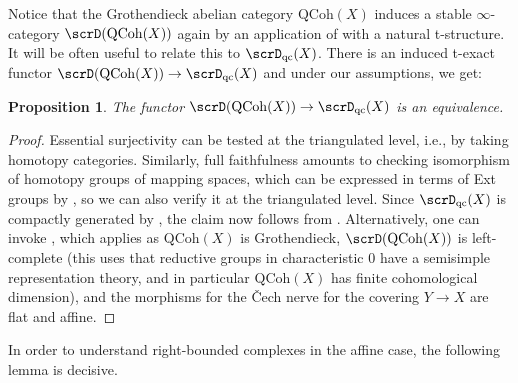 \documentclass[10pt, reqno]{amsart}
\theoremstyle{plain}
\newtheorem{proposition}[theorem]{Proposition}
\theoremstyle{definition}
\numberwithin{equation}{section}
\begin{document}
	Notice that the Grothendieck abelian category $\mathrm{QCoh}(X)$ induces a stable $\infty$-category $\scrD(\mathrm{QCoh}(X))$ again by an application of \cite[Definition 1.3.5.8]{Lur17} with a natural t-structure. It will be often useful to relate this to $\scrD_\mathrm{qc}(X)$. There is an induced t-exact functor $\scrD(\mathrm{QCoh}(X)) \to \scrD_{\mathrm{qc}}(X)$ and under our assumptions, we get:
	
	\begin{proposition}\label{prop_isom_der_coh}
		The functor $\scrD(\mathrm{QCoh}(X)) \to \scrD_{\mathrm{qc}}(X)$ is an equivalence.
	\end{proposition}
	\begin{proof}
		Essential surjectivity can be tested at the triangulated level, i.e., by taking homotopy categories. Similarly, full faithfulness amounts to checking isomorphism of homotopy groups of mapping spaces, which can be expressed in terms of Ext groups by \cite[Notation 1.1.2.17]{Lur17}, so we can also verify it at the triangulated level. Since $\scrD_{\mathrm{qc}}(X)$ is compactly generated by \cite[Theorem B]{HR17}, the claim now follows from \cite[Theorem 1.2]{HNR19}.
		Alternatively, one can invoke \cite[Proposition A.1.2]{Man22}, which applies as $\mathrm{QCoh}(X)$ is Grothendieck, $\scrD(\mathrm{QCoh}(X))$ is left-complete (this uses that reductive groups in characteristic $0$ have a semisimple representation theory, and in particular $\mathrm{QCoh}(X)$ has finite cohomological dimension), and the morphisms for the \v{C}ech nerve for the covering $Y\to X$ are flat and affine.
	\end{proof}
In order to understand right-bounded complexes in the affine case, the following lemma is decisive.
\end{document}
